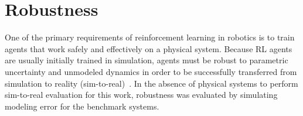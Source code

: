 

\chapter{Robustness}
\label{chapter4}

One of the primary requirements of reinforcement learning in robotics is to train agents that work safely and effectively on a physical system.
Because RL agents are usually initially trained in simulation, agents must be robust to parametric uncertainty and unmodeled dynamics in order to be successfully transferred from simulation to reality (sim-to-real)~\cite{Tobin:2017a,Al-Nima:2021a}. In the absence of physical systems to perform sim-to-real evaluation for this work, robustness was evaluated by simulating modeling error for the benchmark systems.


